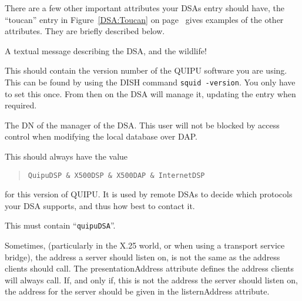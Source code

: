 There are a few other important attributes your DSAs entry should have, the ``toucan''
entry in Figure~\ref{DSA:Toucan} on page~\pageref{DSA:Toucan}
gives examples of the other attributes.
They are briefly described below.
\begin{describe}

\item[\verb+description+:] A textual message describing the DSA, and the wildlife!


\item[\verb+quipuVersion+:] This should contain the version number of the
QUIPU software you are using. 
This can be found by using the DISH
command \verb+squid -version+.  You only have to set this once.  From
then on the DSA will manage it, updating the entry when required.


\item[\verb+manager+:] The DN of the manager of the DSA. This user will not
be blocked by
access control when modifying the local database over DAP.


\item[\verb+supportedApplicationContext+:] This should always have the value
\begin{quote}\begin{verbatim}
QuipuDSP & X500DSP & X500DAP & InternetDSP
\end{verbatim}\end{quote}
for this version of QUIPU.
It is used by remote DSAs to decide which protocols your
 DSA supports, and
thus how best to contact it.

\item[\verb+objectclass+:] This must contain ``\verb+quipuDSA+''.

\item[\verb+listenAddress+:] Sometimes, (particularly in the X.25 world, or
when using a transport service bridge), the
address a server should listen on, is not the same as the address
clients should call.  The presentationAddress attribute defines the 
address clients will always call.  If, and only if, this is not the
address the server should listen on, the address for the server should
be given in the listernAddress attribute.


\end{describe}
